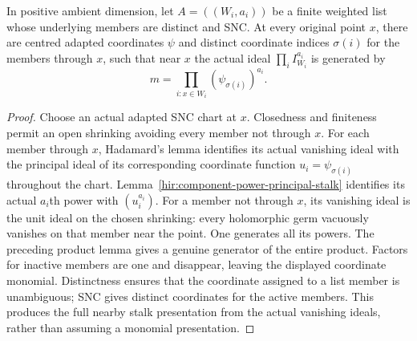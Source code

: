 \begin{lemma}
\label{hir:component-product-coordinate-generator}
\leanok
In positive ambient dimension, let $A=((W_i,a_i))$ be a finite weighted list whose underlying members
are distinct and SNC.  At every original point $x$, there are centred
adapted coordinates $\psi$ and distinct coordinate indices $\sigma(i)$
for the members through $x$, such that near $x$ the actual ideal
$\prod_i I_{W_i}^{a_i}$ is generated by
\[
 m=\prod_{i:x\in W_i}(\psi_{\sigma(i)})^{a_i}.
\]
\end{lemma}
\begin{proof}
Choose an actual adapted SNC chart at $x$.  Closedness and finiteness
permit an open shrinking avoiding every member not through $x$.
For each member through $x$, Hadamard's lemma identifies its actual
vanishing ideal with the principal ideal of its corresponding
coordinate function $u_i=\psi_{\sigma(i)}$ throughout the chart.
Lemma~\ref{hir:component-power-principal-stalk} identifies its actual
$a_i$th power with $(u_i^{a_i})$.
For a member not through $x$, its vanishing ideal is the unit ideal
on the chosen shrinking: every holomorphic germ vacuously vanishes
on that member near the point.  One generates all its powers.
The preceding product lemma gives a genuine generator of the entire
product.  Factors for inactive members are one and disappear, leaving
the displayed coordinate monomial.
Distinctness ensures that the coordinate assigned to a list member
is unambiguous; SNC gives distinct coordinates for the active members.
This produces the full nearby stalk presentation from the actual
vanishing ideals, rather than assuming a monomial presentation.
\end{proof}

